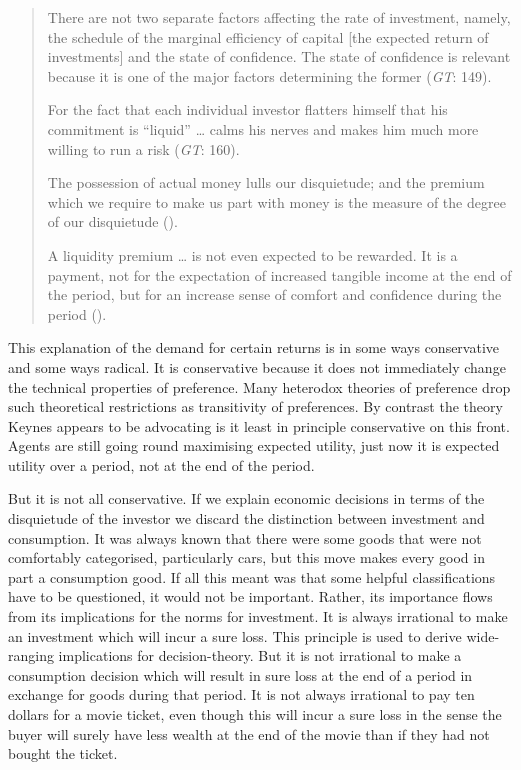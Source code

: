 \documentclass[
  10pt,
  letterpaper,
  DIV=11,
  numbers=noendperiod,
  twoside]{scrartcl}
\begin{document}
\begin{quote}
There are not two separate factors affecting the rate of investment,
namely, the schedule of the marginal efficiency of capital {[}the
expected return of investments{]} and the state of confidence. The state
of confidence is relevant because it is one of the major factors
determining the former (\emph{GT}: 149).

For the fact that each individual investor flatters himself that his
commitment is ``liquid'' \ldots{} calms his nerves and makes him much
more willing to run a risk (\emph{GT}: 160).

The possession of actual money lulls our disquietude; and the premium
which we require to make us part with money is the measure of the degree
of our disquietude ().

A liquidity premium \ldots{} is not even expected to be rewarded. It is
a payment, not for the expectation of increased tangible income at the
end of the period, but for an increase sense of comfort and confidence
during the period ().
\end{quote}

This explanation of the demand for certain returns is in some ways
conservative and some ways radical. It is conservative because it does
not immediately change the technical properties of preference. Many
heterodox theories of preference drop such theoretical restrictions as
transitivity of preferences. By contrast the theory Keynes appears to be
advocating is it least in principle conservative on this front. Agents
are still going round maximising expected utility, just now it is
expected utility over a period, not at the end of the period.

But it is not all conservative. If we explain economic decisions in
terms of the disquietude of the investor we discard the distinction
between investment and consumption. It was always known that there were
some goods that were not comfortably categorised, particularly cars, but
this move makes every good in part a consumption good. If all this meant
was that some helpful classifications have to be questioned, it would
not be important. Rather, its importance flows from its implications for
the norms for investment. It is always irrational to make an investment
which will incur a sure loss. This principle is used to derive
wide-ranging implications for decision-theory. But it is not irrational
to make a consumption decision which will result in sure loss at the end
of a period in exchange for goods during that period. It is not always
irrational to pay ten dollars for a movie ticket, even though this will
incur a sure loss in the sense the buyer will surely have less wealth at
the end of the movie than if they had not bought the ticket.
\end{document}
